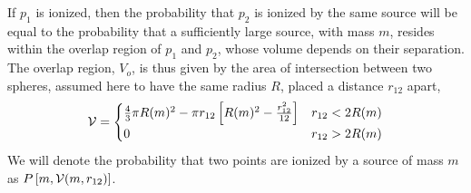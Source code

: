 If $p_1$ is ionized, then the probability that $p_2$ is ionized by the same source will be equal to the probability that a sufficiently large source, with mass $m$, resides within the overlap region of $p_1$ and $p_2$, whose volume depends on their separation. The overlap region, $V_o$, is thus given by the area of intersection between two spheres, assumed here to have the same radius $R$, placed a distance $r_{12}$ apart,
\begin{equation}
  \mathcal{V} = 
  \begin{cases}
    \frac{4}{3}\pi R(m)^2 - \pi r_{12} \left[R(m)^2 - \frac{r_{12}^2}{12} \right] & r_{12} < 2 R(m) \\
    0 & r_{12} > 2 R(m)
  \end{cases}
  \label{eq:V_overlap}
\end{equation}
We will denote the probability that two points are ionized by a source of mass $m$ as $P\left[m,\mathcal{V}(m,r_{12})\right]$.


